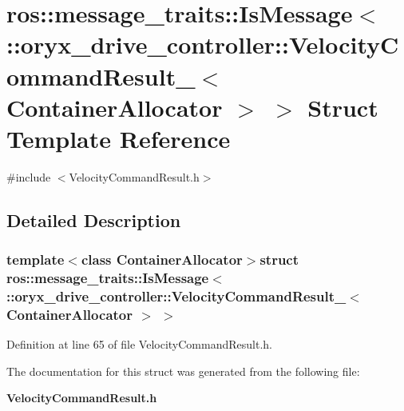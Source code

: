 \section{ros\-:\-:message\-\_\-traits\-:\-:\-Is\-Message$<$ \-:\-:oryx\-\_\-drive\-\_\-controller\-:\-:\-Velocity\-Command\-Result\-\_\-$<$ \-Container\-Allocator $>$ $>$ \-Struct \-Template \-Reference}
\label{structros_1_1message__traits_1_1IsMessage_3_01_1_1oryx__drive__controller_1_1VelocityCommandResu50d66d8237a17beb55b12c6877e1d256}


{\ttfamily \#include $<$\-Velocity\-Command\-Result.\-h$>$}



\subsection{\-Detailed \-Description}
\subsubsection*{template$<$class Container\-Allocator$>$struct ros\-::message\-\_\-traits\-::\-Is\-Message$<$ \-::oryx\-\_\-drive\-\_\-controller\-::\-Velocity\-Command\-Result\-\_\-$<$ Container\-Allocator $>$ $>$}



\-Definition at line 65 of file \-Velocity\-Command\-Result.\-h.



\-The documentation for this struct was generated from the following file\-:\begin{DoxyCompactItemize}
\item 
{\bf \-Velocity\-Command\-Result.\-h}\end{DoxyCompactItemize}
